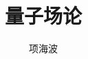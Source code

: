 \documentclass[a4paper]{article}
\begin{document}
\begin{CJK*}{GBK}{}
\title{量子场论}
\author{项海波}
\maketitle
\thispagestyle{empty}%

\newpage
{}
\tableofcontents
\newpage
\listoffigures
\newpage
\listoftables
\newpage
{}


\newpage
\newpage
\newpage
\newpage
\newpage
\newpage
\newpage
\newpage
\newpage
\newpage



\end{CJK*}
\end{document}
